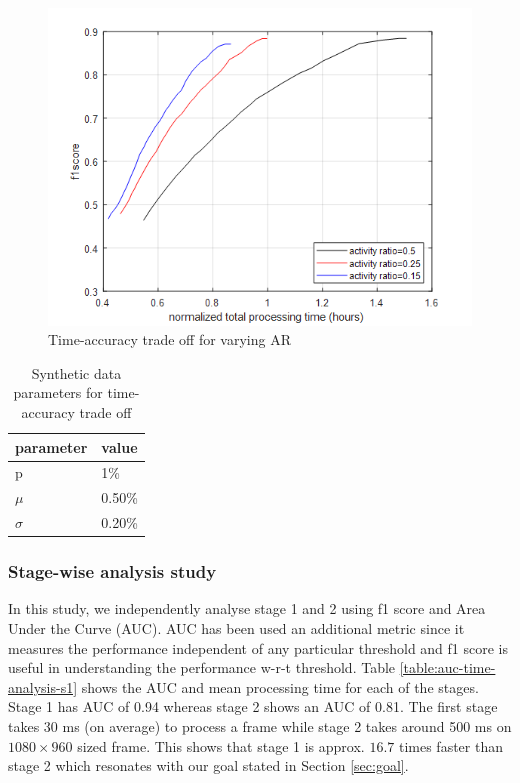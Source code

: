 \begin{figure}
    \centering
    \includegraphics[width=\linewidth]{images/time-acc-tradeoff-ar-mog.png}
    \caption{Time-accuracy trade off for varying AR}
    \label{fig:time-acc-tradeoff-ar-mog}
\end{figure}

\begin{table}
\centering
\caption{Synthetic data parameters for time-accuracy trade off} \vspace{5pt}
\label{table:fig1_data_params}
\begin{tabular}{|l|l|}
\hline
parameter             & value  \\ \hline \hline
p                     & 1\%    \\ 
$\mu$    & 0.50\% \\ 
$\sigma$ & 0.20\% \\ \hline
\end{tabular}
\end{table}

\vspace{5pt}
\subsubsection{Stage-wise analysis study}
In this study, we independently analyse stage 1 and 2 using f1 score and Area Under the Curve (AUC). AUC has been used an additional metric since it measures the performance independent of any particular threshold and f1 score is useful in understanding the performance w-r-t threshold.  
Table \ref{table:auc-time-analysis-s1} shows the AUC and mean processing time for each of the stages. Stage 1 has AUC of 0.94 whereas stage 2 shows an AUC of 0.81. The first stage takes 30 ms  (on average) to process a frame while stage 2 takes around 500 ms on $1080 \times 960$ sized frame. This shows that stage 1 is approx. $16.7$ times faster than stage 2 which resonates with our goal stated in Section \ref{sec:goal}. 

